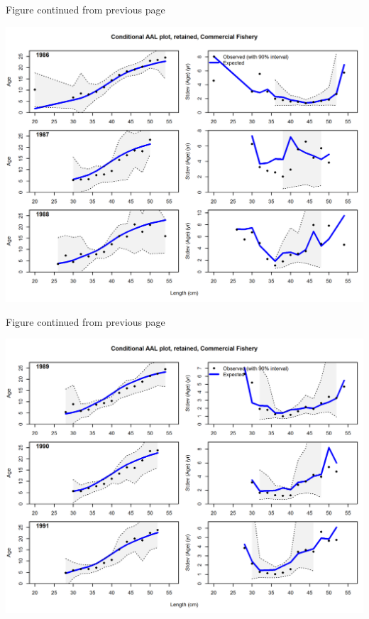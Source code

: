 \documentclass[12pt,]{article}
\begin{document}
\begin{center} 

            Figure continued from previous page 

            \end{center}

\includegraphics{./r4ss/plots_mod2/comp_condAALfit_Andre_plotsflt2mkt2_page3.png}

\begin{center} 

            Figure continued from previous page 

            \end{center}

\includegraphics{./r4ss/plots_mod2/comp_condAALfit_Andre_plotsflt2mkt2_page4.png}
\end{document}
